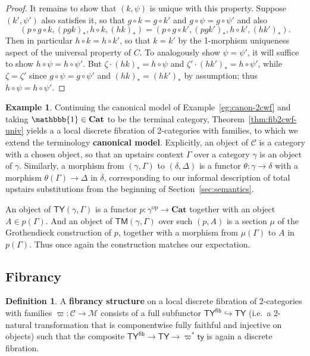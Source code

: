 \documentclass[10pt]{article}
\theoremstyle{definition}
\newtheorem{definition}{Definition}
\newtheorem{example}{Example}
\newcommand\op{^{\mathrm{op}}}
\newcommand\Cat{\mathbf{Cat}}
\newcommand\M{\mathcal{M}}
\newcommand\Mty{\mathsf{ty}}
\newcommand\C{\mathcal{C}}
\newcommand\Cty{\mathsf{TY}}
\newcommand\Cfibty{\mathsf{TY}^{\mathsf{fib}}}
\newcommand\Ctm{\mathsf{TM}}
\newcommand\vp{\varpi}
\newcommand\vpst{\vp^*}
\newcommand\one{\mathbbb{1}}
\newcommand\bb[1]{{(#1)}_*}
\begin{document}
\begin{proof}
  It remains to show that $(k,\psi)$ is unique with this property.
  Suppose $(k',\psi')$ also satisfies it, so that $g\circ k = g\circ k'$ and $g\circ \psi = g\circ \psi'$ and also
  \[ (p\circ g\circ k, \bb{pgk}, h\circ k, \bb{hk}) = (p\circ g\circ k', \bb{pgk'}, h\circ k', \bb{hk'}). \]
  Then in particular $h\circ k = h\circ k'$, so that $k=k'$ by the 1-morphism uniqueness aspect of the universal property of $C$.
  To analogously show $\psi=\psi'$, it will suffice to show $h\circ \psi = h\circ \psi'$.
  But $\zeta \cdot \bb{hk} = h\circ \psi$ and $\zeta' \cdot \bb{hk'} = h\circ \psi'$, while $\zeta=\zeta'$ since $g\circ \psi = g\circ \psi'$ and $\bb{hk} = \bb{hk'}$ by assumption; thus $h\circ \psi = h\circ \psi'$.
\end{proof}

\begin{example}
  Continuing the canonical model of Example~\ref{eg:canon-2cwf} and taking $\one\in\Cat$ to be the terminal category, Theorem~\ref{thm:fib2cwf-univ} yields a a local discrete fibration of 2-categories with families, to which we extend the terminology \textbf{canonical model}.
  Explicitly, an object of $\C$ is a category with a chosen object, so that an upstairs context $\Gamma$ over a category $\gamma$ is an object of $\gamma$.
  Similarly, a morphism from $(\gamma,\Gamma)$ to $(\delta,\Delta)$ is a functor $\theta:\gamma\to \delta$ with a morphism $\theta(\Gamma)\to \Delta$ in $\delta$, corresponding to our informal description of total upstairs substitutions from the beginning of Section~\ref{sec:semantics}.

  An object of $\Cty(\gamma,\Gamma)$ is a functor $p:\gamma\op\to\Cat$ together with an object $A\in p(\Gamma)$.
  And an object of $\Ctm(\gamma,\Gamma)$ over such $(p,A)$ is a section $\mu$ of the Grothendieck construction of $p$, together with a morphism from $\mu(\Gamma)$ to $A$ in $p(\Gamma)$.
  Thus once again the construction matches our expectation.
\end{example}



\subsection{Fibrancy}
\label{sec:fibrancy}

\begin{definition}
  A \textbf{fibrancy structure} on a local discrete fibration of 2-categories with families $\vp : \C\to\M$ consists of a full subfunctor $\Cfibty \hookrightarrow \Cty$ (i.e.\ a 2-natural transformation that is componentwise fully faithful and injective on objects) such that the composite $\Cfibty \to \Cty \to \vpst \Mty$ is again a discrete fibration.
\end{definition}
\end{document}
